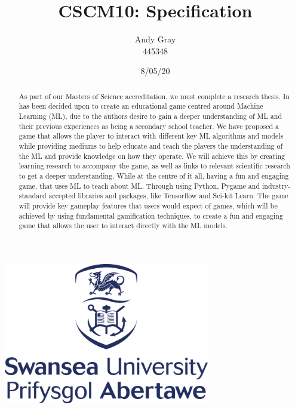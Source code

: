 \documentclass[a4paper,10pt]{article}
\begin{document}
\title{\textbf{CSCM10: Specification}}
\date{8/05/20}
\author{Andy Gray\\445348}




\maketitle
\begin{center}
\item\includegraphics[width=9cm]{swansea.png}
\end{center}

\thispagestyle{empty}
\newpage
{}

\begin{abstract}
	As part of our Masters of Science accreditation, we must complete a research thesis. In has been decided upon to create an educational game centred around Machine Learning (ML), due to the authors desire to gain a deeper understanding of ML and their previous experiences as being a secondary school teacher. We have proposed a game that allows the player to interact with different key ML algorithms and models while providing mediums to help educate and teach the players the understanding of the ML and provide knowledge on how they operate. We will achieve this by creating learning research to accompany the game, as well as links to relevant scientific research to get a deeper understanding. While at the centre of it all, having a fun and engaging game, that uses ML to teach about ML. Through using Python, Pygame and industry-standard accepted libraries and packages, like Tensorflow and Sci-kit Learn. The game will provide key gameplay features that users would expect of games, which will be achieved by using fundamental gamification techniques, to create a fun and engaging game that allows the user to interact directly with the ML models. 
\end{abstract}
\end{document}
